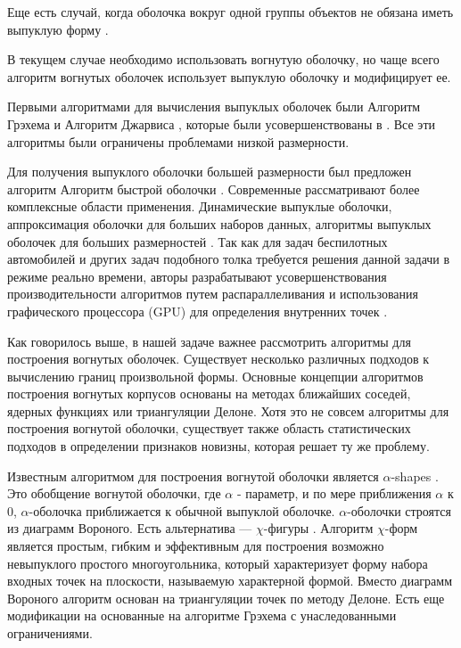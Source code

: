 Еще есть случай, когда оболочка вокруг одной группы объектов не обязана иметь выпуклую форму \cite{rejerHypertubePossibleInterpolation2006,j.a.leonardUsingRadialBasis1992,verleysenLearningHighdimensionalData2001}.

В текущем случае необходимо использовать вогнутую оболочку, но чаще всего алгоритм вогнутых оболочек использует выпуклую оболочку и модифицирует ее.

Первыми алгоритмами для вычисления выпуклых оболочек были Алгоритм Грэхема \cite{grahamEfficientAlgorithDetermining1972} и Алгоритм Джарвиса \cite{jarvisIdentificationConvexHull1973}, которые были усовершенствованы в \cite{chanOptimalOutputsensitiveConvex1996}. Все эти алгоритмы были ограничены проблемами низкой размерности. 

Для получения выпуклого оболочки большей размерности был предложен алгоритм Алгоритм быстрой оболочки \cite{clarksonApplicationsRandomSampling1988}. Современные рассматривают более комплексные области применения. Динамические выпуклые оболочки, аппроксимация оболочки для больших наборов данных, алгоритмы выпуклых оболочек для больших размерностей \cite{brodalDynamicPlanarConvex2002,khosravaniSimpleAlgorithmConvex2013,zhongFindingConvexHull2014}. Так как для задач беспилотных автомобилей и других задач подобного толка требуется решения данной задачи в режиме реально времени, авторы разрабатывают усовершенствования производительности алгоритмов путем распараллеливания и использования графического процессора (GPU) для определения внутренних точек \cite{zhongFindingConvexHull2014,cintraSpeculativeParallelizationRandomized2004,cintraSpeculativeParallelizationRandomized2004,tangSMI2012Full2012,tzengFindingConvexHulls2012}.

Как говорилось выше, в нашей задаче важнее рассмотрить алгоритмы для построения вогнутых оболочек. Существует несколько различных подходов к вычислению границ произвольной формы. Основные концепции алгоритмов построения вогнутых корпусов основаны на методах ближайших соседей, ядерных функциях или триангуляции Делоне. Хотя это не совсем алгоритмы для построения вогнутой оболочки, существует также область статистических подходов в определении признаков новизны, которая решает ту же проблему. 

Известным алгоритмом для построения вогнутой оболочки является $\alpha$-shapes \cite{edelsbrunnerShapeSetPoints1983,edelsbrunnerThreedimensionalAlphaShapes1992}. Это обобщение вогнутой оболочки, где $\alpha$ - параметр, и по мере приближения $\alpha$ к 0, $\alpha$-оболочка приближается к обычной выпуклой оболочке. $\alpha$-оболочки строятся из диаграмм Вороного. Есть альтернатива --- $\chi$-фигуры \cite{duckhamEfficientGenerationSimple2008}. Алгоритм $\chi$-форм является простым, гибким и эффективным для построения возможно невыпуклого простого многоугольника, который характеризует форму набора входных точек на плоскости, называемую характерной формой. Вместо диаграмм Вороного алгоритм основан на триангуляции точек по методу Делоне. Есть еще модификации на основанные на алгоритме Грэхема \cite{xuConcaveHullAlgorithm2010} с унаследованными ограничениями. 

